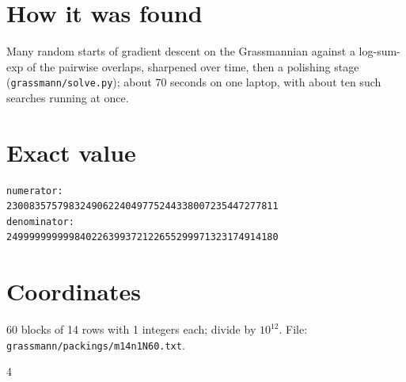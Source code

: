 \documentclass[11pt,a4paper]{article}
\begin{document}
\section{How it was found}
Many random starts of gradient descent on the Grassmannian against a log-sum-exp of the pairwise overlaps, sharpened over time, then a polishing stage (\texttt{grassmann/solve.py}); about 70 seconds on one laptop, with about ten such searches running at once.


\appendix
\section{Exact value}
{\small
\begin{verbatim}
numerator:
230083575798324906224049775244338007235447277811
denominator:
249999999999840226399372122655299971323174914180
\end{verbatim}}

\section{Coordinates}
60 blocks of 14 rows with 1 integers each; divide by $10^{12}$. File: \texttt{grassmann/packings/m14n1N60.txt}.
{\tiny
\begin{multicols}{4}
\end{multicols}}
\end{document}

